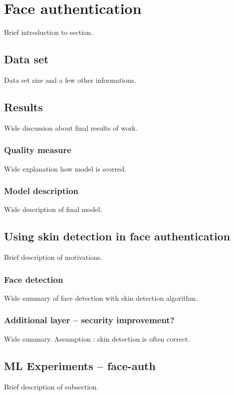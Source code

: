 \section{Face authentication}
    Brief introduction to section.

    \subsection{Data set}
        Data set size and a few other informations.

    \subsection{Results}
        Wide discussion about final results of work.

        \subsubsection*{Quality measure}   %
            Wide explanation how model is scorred.

        \subsubsection*{Model description} %
            Wide description of final model.

    \subsection{Using skin detection in face authentication}
            Brief description of motivations.

        \subsubsection*{Face detection}
            Wide summary of face detection with
            skin detection algorithm.

        \subsubsection*{Additional layer -- security improvement?}
            Wide summary.
            Assumption : skin detection is often correct.

    \subsection{ML Experiments -- face-auth}
        Brief description of subsection.
